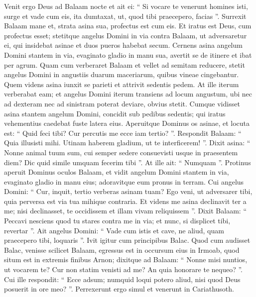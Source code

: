 \begin{biblechapter}
\begin{biblechapter}
\begin{biblechapter}
\begin{biblechapter}
\begin{biblechapter}
\begin{biblechapter}
\begin{biblechapter}
\begin{biblechapter}
\begin{biblechapter}
\begin{biblechapter}
\begin{biblechapter}
\begin{biblechapter}
\begin{biblechapter}
\begin{biblechapter}
\begin{biblechapter}
\begin{biblechapter}
\begin{biblechapter}
\begin{biblechapter}
\begin{biblechapter}
\begin{biblechapter}
\begin{biblechapter}
\begin{biblechapter}
 \verse Venit ergo Deus ad Balaam nocte et ait ei: “ Si vocare te venerunt homines isti, surge et vade cum eis, ita dumtaxat, ut, quod tibi praecepero, facias ”. 
\verse Surrexit Balaam mane et, strata asina sua, profectus est cum eis.
 \verse Et iratus est Deus, cum profectus esset; stetitque angelus Domini in via contra Balaam, ut adversaretur ei, qui insidebat asinae et duos pueros habebat secum. 
\verse Cernens asina angelum Domini stantem in via, evaginato gladio in manu sua, avertit se de itinere et ibat per agrum. Quam cum verberaret Balaam et vellet ad semitam reducere, 
\verse stetit angelus Domini in angustiis duarum maceriarum, quibus vineae cingebantur. 
\verse Quem videns asina iunxit se parieti et attrivit sedentis pedem. At ille iterum verberabat eam; 
\verse et angelus Domini iterum transiens ad locum angustum, ubi nec ad dexteram nec ad sinistram poterat deviare, obvius stetit. 
\verse Cumque vidisset asina stantem angelum Domini, concidit sub pedibus sedentis; qui iratus vehementius caedebat fuste latera eius.
 \verse Aperuitque Dominus os asinae, et locuta est: “ Quid feci tibi? Cur percutis me ecce iam tertio? ”. 
\verse Respondit Balaam: “ Quia illusisti mihi. Utinam haberem gladium, ut te interficerem! ”. 
\verse Dixit asina: “ Nonne animal tuum sum, cui semper sedere consuevisti usque in praesentem diem? Dic quid simile umquam fecerim tibi ”. At ille ait: “ Numquam ”.
 \verse Protinus aperuit Dominus oculos Balaam, et vidit angelum Domini stantem in via, evaginato gladio in manu eius; adoravitque eum pronus in terram. 
\verse Cui angelus Domini: “ Cur, inquit, tertio verberas asinam tuam? Ego veni, ut adversarer tibi, quia perversa est via tua mihique contraria. 
\verse Et videns me asina declinavit ter a me; nisi declinasset, te occidissem et illam vivam reliquissem ”. 
\verse Dixit Balaam: “ Peccavi nesciens quod tu stares contra me in via; et nunc, si displicet tibi, revertar ”. 
\verse Ait angelus Domini: “ Vade cum istis et cave, ne aliud, quam praecepero tibi, loquaris ”. Ivit igitur cum principibus Balac.
 \verse Quod cum audisset Balac, venisse scilicet Balaam, egressus est in occursum eius in Irmoab, quod situm est in extremis finibus Arnon; 
\verse dixitque ad Balaam: “ Nonne misi nuntios, ut vocarem te? Cur non statim venisti ad me? An quia honorare te nequeo? ”. 
\verse Cui ille respondit: “ Ecce adsum; numquid loqui potero aliud, nisi quod Deus posuerit in ore meo? ”. 
\verse Perrexerunt ergo simul et venerunt in Cariathusoth. 

\end{biblechapter}
\end{biblechapter}
\end{biblechapter}
\end{biblechapter}
\end{biblechapter}
\end{biblechapter}
\end{biblechapter}
\end{biblechapter}
\end{biblechapter}
\end{biblechapter}
\end{biblechapter}
\end{biblechapter}
\end{biblechapter}
\end{biblechapter}
\end{biblechapter}
\end{biblechapter}
\end{biblechapter}
\end{biblechapter}
\end{biblechapter}
\end{biblechapter}
\end{biblechapter}
\end{biblechapter}
